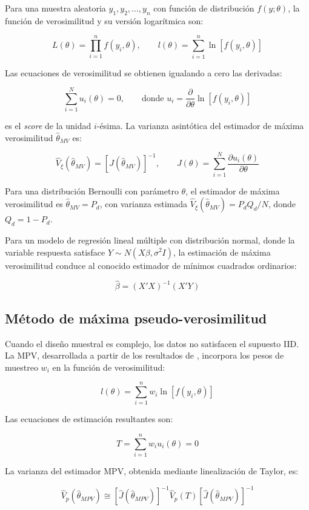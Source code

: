\documentclass[
  spanish,
  12pt,
]{book}
\begin{document}
Para una muestra aleatoria \(y_1, y_2, \ldots, y_n\) con función de distribución \(f(y; \theta)\), la función de verosimilitud y su versión logarítmica son:

\[
L(\theta) = \prod_{i=1}^{n} f(y_i, \theta), \qquad l(\theta) = \sum_{i=1}^{n} \ln[f(y_i, \theta)]
\]

Las ecuaciones de verosimilitud se obtienen igualando a cero las derivadas:

\[
\sum_{i=1}^{N} u_i(\theta) = 0, \qquad \text{donde } u_i = \frac{\partial}{\partial\theta} \ln[f(y_i, \theta)]
\]

es el \emph{score} de la unidad \(i\)-ésima. La varianza asintótica del estimador de máxima verosimilitud \(\hat{\theta}_{MV}\) es:

\[
\hat{V}_{\xi}(\hat{\theta}_{MV}) = [J(\hat{\theta}_{MV})]^{-1}, \qquad J(\theta) = \sum_{i=1}^{N} \frac{\partial u_i(\theta)}{\partial \theta}
\]

Para una distribución Bernoulli con parámetro \(\theta\), el estimador de máxima verosimilitud es \(\hat{\theta}_{MV} = P_d\), con varianza estimada \(\hat{V}_\xi(\hat{\theta}_{MV}) = P_d Q_d / N\), donde \(Q_d = 1 - P_d\).

Para un modelo de regresión lineal múltiple con distribución normal, donde la variable respuesta satisface \(Y \sim N(X\beta, \sigma^2 I)\), la estimación de máxima verosimilitud conduce al conocido estimador de mínimos cuadrados ordinarios:

\[
\hat{\beta} = (X'X)^{-1}(X'Y)
\]

\subsection{Método de máxima pseudo-verosimilitud}\label{sec-mpv-formal}

Cuando el diseño muestral es complejo, los datos no satisfacen el supuesto IID. La MPV, desarrollada a partir de los resultados de \citet{binder1983variances}, incorpora los pesos de muestreo \(w_i\) en la función de verosimilitud:

\[
l(\theta) = \sum_{i=1}^{n} w_i \ln[f(y_i, \theta)]
\]

Las ecuaciones de estimación resultantes son:

\[
T = \sum_{i=1}^{n} w_i u_i(\theta) = 0
\]

La varianza del estimador MPV, obtenida mediante linealización de Taylor, es:

\[
\hat{V}_p(\hat{\theta}_{MPV}) \cong [\hat{J}(\hat{\theta}_{MPV})]^{-1} \hat{V}_p(T) [\hat{J}(\hat{\theta}_{MPV})]^{-1}
\]
\end{document}

